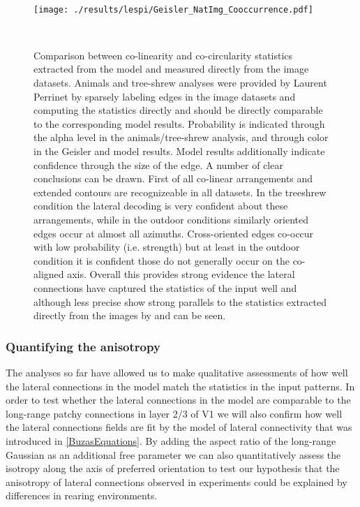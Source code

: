 \begin{figure}
  \begin{minipage}[t]{0.6\textwidth}
    \mbox{}\\[-\baselineskip]    \texttt{[image: ./results/lespi/Geisler\_NatImg\_Cooccurrence.pdf]}
  \end{minipage}\hfill
  \begin{minipage}[t]{0.35\textwidth}
    \mbox{}\\[-\baselineskip]
	\caption{Comparison between co-linearity and co-circularity
      statistics extracted from the model and measured directly from
      the image datasets. Animals and tree-shrew analyses were
      provided by Laurent Perrinet by sparsely labeling edges in the
      image datasets and computing the statistics directly and should
      be directly comparable to the corresponding model
      results. Probability is indicated through the alpha level in the
      animals/tree-shrew analysis, and through color in the Geisler
      and model results. Model results additionally indicate
      confidence through the size of the edge. A number of clear
      conclusions can be drawn. First of all co-linear arrangements
      and extended contours are recognizeable in all datasets. In the
      treeshrew condition the lateral decoding is very confident about
      these arrangements, while in the outdoor conditions similarly
      oriented edges occur at almost all azimuths. Cross-oriented
      edges co-occur with low probability (i.e. strength) but at least
      in the outdoor condition it is confident those do not generally
      occur on the co-aligned axis. Overall this provides strong
      evidence the lateral connections have captured the statistics of
      the input well and although less precise show strong parallels
      to the statistics extracted directly from the images by
      \cite{Geisler2001} and \cite{Perrinet2015} can be seen.}
	\label{NatImgGeisler}
    \end{minipage}
\end{figure}

\subsubsection*{Quantifying the anisotropy}

The analyses so far have allowed us to make qualitative assessments of
how well the lateral connections in the model match the statistics in
the input patterns. In order to test whether the lateral connections
in the model are comparable to the long-range patchy connections in
layer 2/3 of V1 we will also confirm how well the lateral connections
fields are fit by the \cite{Buzas2006} model of lateral connectivity
that was introduced in \ref{BuzasEquations}. By adding the aspect
ratio of the long-range Gaussian as an additional free parameter we
can also quantitatively assess the isotropy along the axis of
preferred orientation to test our hypothesis that the anisotropy of
lateral connections observed in experiments \citep{Bosking1997} could
be explained by differences in rearing environments.

